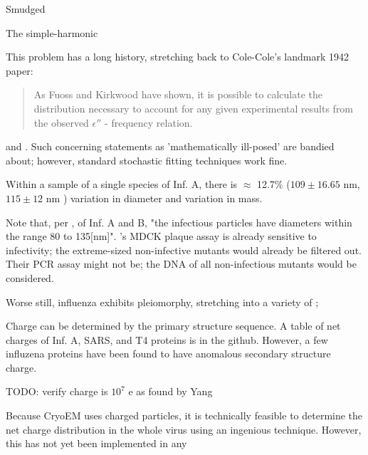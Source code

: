 \documentclass[paper.tex]{subfiles}
\begin{document}
Smudged 

The simple-harmonic

This problem has a long history, stretching back to Cole-Cole's landmark 1942\cite{Dispersion1941} paper:

\begin{quote}
	As Fuoss and Kirkwood have shown, it is possible to calculate the distribution necessary to account for any given experimental results from the observed $\epsilon''$ - frequency relation.
\end{quote}

and \cite{Electrical1941}. Such concerning statements as 'mathematically ill-posed' are bandied about; however, standard stochastic fitting techniques work fine.



Within a sample of a single species of Inf. A, there is $\approx$ 12.7\%  ($109 \pm 16.65 \text{ nm}$\cite{lauffer1944biophysical}, $115 \pm 12 \text{ nm}$ \cite{Characterization1984}) variation in diameter and  \cite{Characterization1984} variation in mass.



Note that, per \cite{lauffer1944biophysical}, of Inf. A and B, "the infectious particles have diameters within the range 80 to 135[nm]". \cite{Efficient2015}'s MDCK plaque assay is already sensitive to infectivity; the extreme-sized non-infective mutants would already be filtered out. Their PCR assay might not be; the DNA of all non-infectious mutants would be considered.


Worse still, influenza exhibits pleiomorphy, stretching into a variety of \cite{Influenza2006}; 

Charge can be determined by the primary structure sequence. A table of net charges of Inf. A, SARS, and T4 proteins is in the github. However, a few influzena proteins have been found to have anomalous secondary structure charge.

TODO: verify charge is $10^7$ e as found by Yang

Because CryoEM uses charged particles, it is technically feasible to determine the net charge distribution in the whole virus using an ingenious \cite{Identification2018} technique. However, this has not yet been implemented in any


\footnotemark

\end{document}
